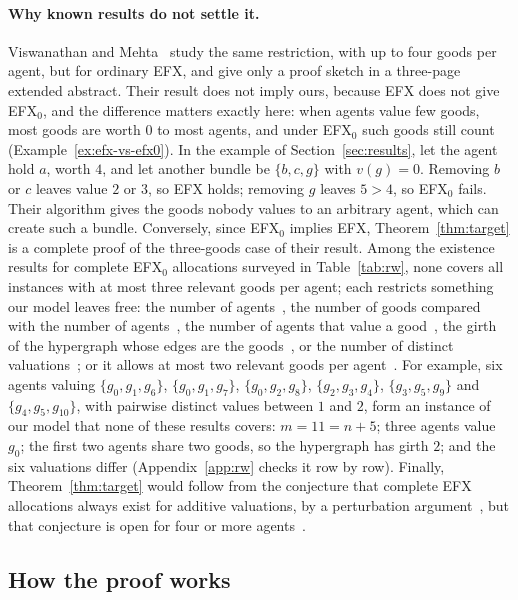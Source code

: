 \documentclass[runningheads,11pt]{llncs}
\newcommand{\efxz}{\texorpdfstring{\mbox{EFX$_0$}}{EFX0}}
\begin{document}
\paragraph{Why known results do not settle it.} Viswanathan and Mehta~\cite{ViswanathanM24} study the same restriction, with up to four goods per agent, but for ordinary EFX, and give only a proof sketch in a three-page extended abstract. Their result does not imply ours, because EFX does not give \efxz{}, and the difference matters exactly here: when agents value few goods, most goods are worth $0$ to most agents, and under \efxz{} such goods still count (Example~\ref{ex:efx-vs-efx0}). In the example of Section~\ref{sec:results}, let the agent hold $a$, worth $4$, and let another bundle be $\{b,c,g\}$ with $v(g)=0$. Removing $b$ or $c$ leaves value $2$ or $3$, so EFX holds; removing $g$ leaves $5>4$, so \efxz{} fails. Their algorithm gives the goods nobody values to an arbitrary agent, which can create such a bundle. Conversely, since \efxz{} implies EFX, Theorem~\ref{thm:target} is a complete proof of the three-goods case of their result. Among the existence results for complete \efxz{} allocations surveyed in Table~\ref{tab:rw}, none covers all instances with at most three relevant goods per agent; each restricts something our model leaves free: the number of agents~\cite{ChaudhuryGM20,AlkassarFM26}, the number of goods compared with the number of agents~\cite{Mahara21,Bratby26}, the number of agents that value a good~\cite{AfshinmehrAMMS26,ChristodoulouFKS23,SgouritsaS25,KavianiSS24}, the girth of the hypergraph whose edges are the goods~\cite{LianeasSS26}, or the number of distinct valuations~\cite{HVGNV25}; or it allows at most two relevant goods per agent~\cite{MrdEfx}. For example, six agents valuing $\{g_0,g_1,g_6\}$, $\{g_0,g_1,g_7\}$, $\{g_0,g_2,g_8\}$, $\{g_2,g_3,g_4\}$, $\{g_3,g_5,g_9\}$ and $\{g_4,g_5,g_{10}\}$, with pairwise distinct values between $1$ and $2$, form an instance of our model that none of these results covers: $m=11=n+5$; three agents value $g_0$; the first two agents share two goods, so the hypergraph has girth $2$; and the six valuations differ (Appendix~\ref{app:rw} checks it row by row). Finally, Theorem~\ref{thm:target} would follow from the conjecture that complete EFX allocations always exist for additive valuations, by a perturbation argument~\cite{ChaudhuryGM20}, but that conjecture is open for four or more agents~\cite{AlkassarFM26}.

\subsection{How the proof works}\label{sec:overview}
\end{document}
